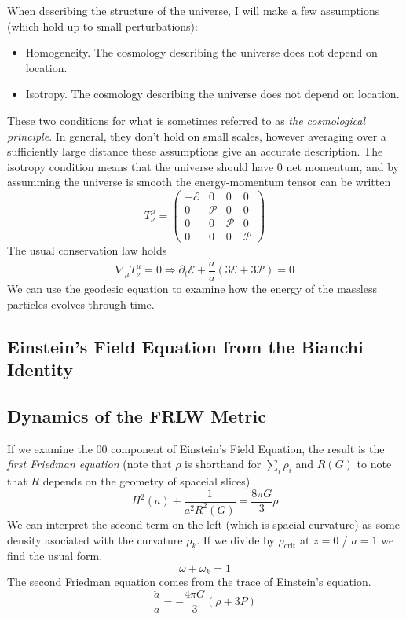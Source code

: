 When describing the structure of the universe, I will make a few assumptions (which hold up to small perturbations):
\begin{itemize}
    \item Homogeneity. The cosmology describing the universe does not depend on location.
    \item Isotropy. The cosmology describing the universe does not depend on location.
\end{itemize}
These two conditions for what is sometimes referred to as \textit{the cosmological principle}. In general, they don't hold on small scales, however averaging over a sufficiently large distance these assumptions give an accurate description. The isotropy condition means that the universe should have 0 net momentum, and by assumming the universe is smooth the energy-momentum tensor can be written
\begin{equation} T^\mu_\nu = \left(
\begin{array}{cccc}
    -\mathcal{E} & 0 & 0 & 0 \\
    0 & \mathcal{P} & 0 & 0 \\
    0 & 0 & \mathcal{P} & 0 \\
    0 & 0 & 0 & \mathcal{P}
\end{array}
\right)
\end{equation}
The usual conservation law holds
\begin{equation}
    \nabla_\mu T^{\mu}_{\nu} = 0 \Rightarrow \partial_t \mathcal{E} + \frac{\dot a}{a}(3\mathcal{E} + 3\mathcal{P}) = 0
\end{equation}
We can use the geodesic equation to examine how the energy of the massless particles evolves through time. 

\subsection{Einstein's Field Equation from the Bianchi Identity}

\subsection{Dynamics of the FRLW Metric}
If we examine the $00$ component of Einstein's Field Equation, the result is the \textit{first Friedman equation} (note that $\rho$ is shorthand for $\sum_i\rho_i$ and $R(G)$ to note that $R$ depends on the geometry of spaceial slices)
\begin{equation}
    H^2(a) + \frac{1}{a^2 R^2(G)} = \frac{8\pi G}{3}\rho
\end{equation}
We can interpret the second term on the left (which is spacial curvature) as some density asociated with the curvature $\rho_k$. If we divide by $\rho_{\text{crit}}$ at $z=0$ / $a=1$ we find the usual form. 
\begin{equation}
    \omega + \omega_k = 1 
\end{equation}
The second Friedman equation comes from the trace of Einstein's equation.
\begin{equation}
    \frac{\ddot a}{a} = -\frac{4\pi G}{3}(\rho + 3P)
\end{equation}
